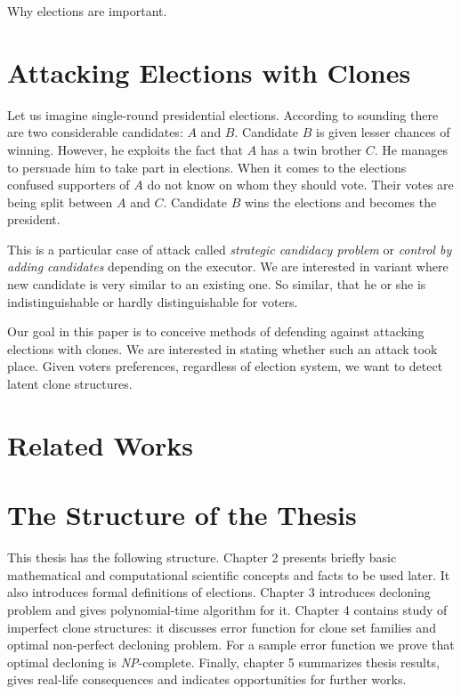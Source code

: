 

Why elections are important.

\section{Attacking Elections with Clones}


Let us imagine single-round presidential elections.
According to sounding there are two considerable candidates: $A$ and $B$.
Candidate $B$ is given lesser chances of winning.
However, he exploits the fact that $A$ has a twin brother $C$.
He manages to persuade him to take part in elections.
When it comes to the elections confused supporters of $A$ do not know on whom they should vote.
Their votes are being split between $A$ and $C$.
Candidate $B$ wins the elections and becomes the president.

This is a particular case of attack called \textit{strategic candidacy problem} or \textit{control by adding candidates}
depending on the executor.
We are interested in variant where new candidate is very similar to an existing one.
So similar, that he or she is indistinguishable or hardly distinguishable for voters.

Our goal in this paper is to conceive methods of defending against attacking elections with clones.
We are interested in stating whether such an attack took place.
Given voters preferences, regardless of election system, we want to detect latent clone structures.

\section{Related Works}


\section{The Structure of the Thesis}


This thesis has the following structure.
Chapter 2 presents briefly basic mathematical and computational scientific concepts and facts to be used later.
It also introduces formal definitions of elections.
Chapter 3 introduces decloning problem and gives polynomial-time algorithm for it.
Chapter 4 contains study of imperfect clone structures:
it discusses error function for clone set families and optimal non-perfect decloning problem.
For a sample error function we prove that optimal decloning is \textit{NP}-complete.
Finally, chapter 5 summarizes thesis results, gives real-life consequences and indicates opportunities for further works.
